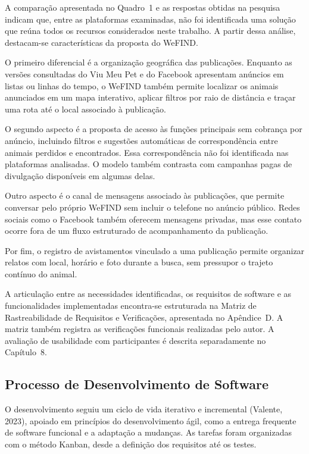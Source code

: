 A comparação apresentada no Quadro~1 e as respostas obtidas na pesquisa indicam que, entre as plataformas examinadas, não foi identificada uma solução que reúna todos os recursos considerados neste trabalho. A partir dessa análise, destacam-se características da proposta do WeFIND.

O primeiro diferencial é a organização geográfica das publicações. Enquanto as versões consultadas do Viu Meu Pet e do Facebook apresentam anúncios em listas ou linhas do tempo, o WeFIND também permite localizar os animais anunciados em um mapa interativo, aplicar filtros por raio de distância e traçar uma rota até o local associado à publicação.

O segundo aspecto é a proposta de acesso às funções principais sem cobrança por anúncio, incluindo filtros e sugestões automáticas de correspondência entre animais perdidos e encontrados. Essa correspondência não foi identificada nas plataformas analisadas. O modelo também contrasta com campanhas pagas de divulgação disponíveis em algumas delas.

Outro aspecto é o canal de mensagens associado às publicações, que permite conversar pelo próprio WeFIND sem incluir o telefone no anúncio público. Redes sociais como o Facebook também oferecem mensagens privadas, mas esse contato ocorre fora de um fluxo estruturado de acompanhamento da publicação.

Por fim, o registro de avistamentos vinculado a uma publicação permite organizar relatos com local, horário e foto durante a busca, sem pressupor o trajeto contínuo do animal.

A articulação entre as necessidades identificadas, os requisitos de software e as funcionalidades implementadas encontra-se estruturada na Matriz de Rastreabilidade de Requisitos e Verificações, apresentada no Apêndice~D. A matriz também registra as verificações funcionais realizadas pelo autor. A avaliação de usabilidade com participantes é descrita separadamente no Capítulo~8.

\subsection{Processo de Desenvolvimento de Software}

O desenvolvimento seguiu um ciclo de vida iterativo e incremental (Valente, 2023), apoiado em princípios do desenvolvimento ágil, como a entrega frequente de software funcional e a adaptação a mudanças. As tarefas foram organizadas com o método Kanban, desde a definição dos requisitos até os testes.


